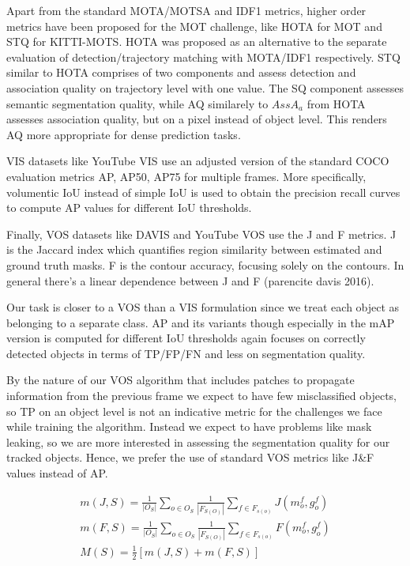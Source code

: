 Apart from the standard MOTA/MOTSA and IDF1 metrics, higher order metrics have been proposed for the MOT challenge, like HOTA for MOT and STQ for KITTI-MOTS. HOTA was proposed as an alternative to the separate evaluation of detection/trajectory matching with MOTA/IDF1 respectively. STQ similar to HOTA comprises of two components and assess detection and association quality on trajectory level with one value. The SQ component assesses semantic segmentation quality, while AQ similarely to $AssA_a$  from HOTA assesses association quality, but on a pixel instead of object level. This renders AQ more appropriate for dense prediction tasks. \par

VIS datasets like YouTube VIS use an adjusted version of the standard COCO evaluation metrics AP, AP50, AP75 for multiple frames. More specifically, volumentic IoU instead of simple IoU is used to obtain the precision recall curves  to compute AP values for different IoU thresholds. \par

Finally, VOS datasets like DAVIS and YouTube VOS use the J and F metrics. J is the Jaccard index which quantifies region similarity between estimated and ground truth masks. F is the contour accuracy, focusing solely on the contours. In general there's a linear dependence between J and F (parencite davis 2016). \par

Our task is closer to a VOS than a VIS formulation since we treat each object as belonging to a separate class. AP and its variants though especially in the mAP version is computed for different IoU thresholds again focuses on correctly detected objects in terms of TP/FP/FN and less on segmentation quality. \par

By the nature of our VOS algorithm that includes patches to propagate information from the previous frame we expect to have few misclassified objects, so TP on an object level is not an indicative metric for the challenges we face while training the algorithm. Instead we expect to have problems like mask leaking, so we are more interested in assessing the segmentation quality for our tracked objects. Hence, we prefer the use of standard VOS metrics like J\&F values instead of AP. \par


\begin{gather}
    m(J,S) = \frac{1}{|O_S|}\sum_{o \in O_S} \frac{1}{|F_{S(O)}|}\sum_{f \in F_{s(o)}}J(m_o^f, g_o^f)\\
    m(F,S) = \frac{1}{|O_S|}\sum_{o \in O_S} \frac{1}{|F_{S(O)}|}\sum_{f \in F_{s(o)}}F(m_o^f, g_o^f)\\
    M(S) = \frac{1}{2}[m(J,S)+m(F,S)]
\end{gather}

